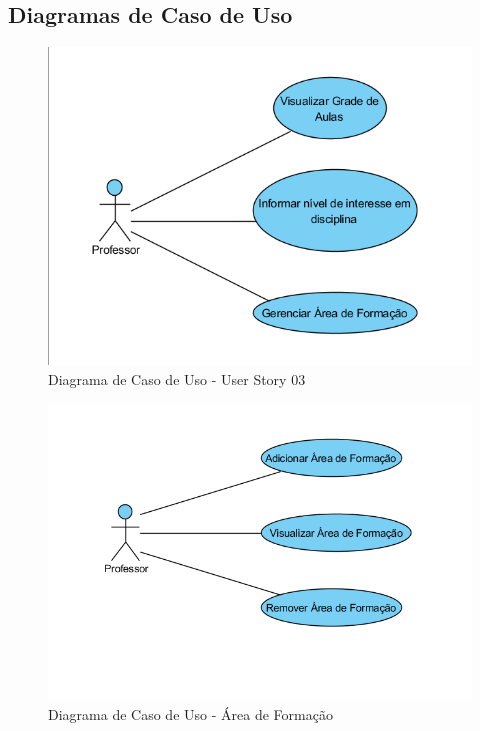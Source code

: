 \documentclass{abnt}
\begin{document}
		\subsection{Diagramas de Caso de Uso}
			\begin{figure}[h]
				\begin{center}
				 \includegraphics[width=450px]{CasoUsoUserStory3}
				 \caption{Diagrama de Caso de Uso - User Story 03}
				 \label{fig:CasoUsoUserStory3}
				\end{center}
			\end{figure}
			
			\begin{figure}[h]
				\begin{center}
				 \includegraphics[width=450px]{CasoUsoAreaFormacao}
				 \caption{Diagrama de Caso de Uso - Área de Formação}
				 \label{fig:CasoUsoAreaFormacao}
				\end{center}
			\end{figure}
			\FloatBarrier	
		
\end{document}
